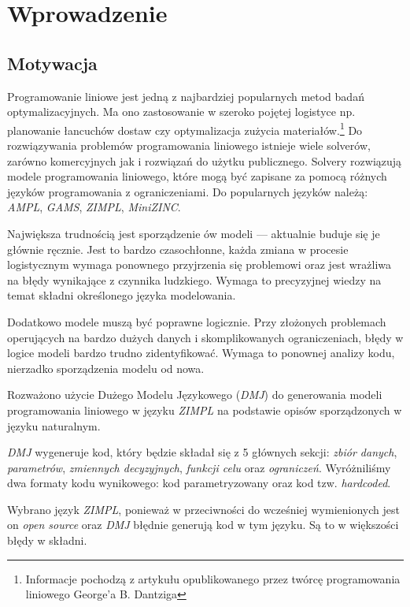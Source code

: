 
\chapter{Wprowadzenie}

\section{Motywacja}

Programowanie liniowe jest jedną z najbardziej popularnych metod badań optymalizacyjnych. Ma ono zastosowanie w szeroko pojętej logistyce np. planowanie łancuchów dostaw czy optymalizacja zużycia materiałów.\footnote{Informacje pochodzą z artykułu opublikowanego przez twórcę programowania liniowego George'a B. Dantziga\cite{dantzig2002linear}} Do rozwiązywania problemów programowania liniowego istnieje wiele solverów, zarówno komercyjnych jak i rozwiązań do użytku publicznego. Solvery rozwiązują modele programowania liniowego, które mogą być zapisane za pomocą różnych języków programowania z ograniczeniami. Do popularnych języków należą: \textit{AMPL}, \textit{GAMS}, \textit{ZIMPL}, \textit{MiniZINC}.

Największa trudnością jest sporządzenie ów modeli --- aktualnie buduje się je głównie ręcznie. Jest to bardzo czasochłonne, każda zmiana w procesie logistycznym wymaga ponownego przyjrzenia się problemowi oraz jest wrażliwa na błędy wynikające z czynnika ludzkiego. Wymaga to precyzyjnej wiedzy na temat składni określonego języka modelowania.

Dodatkowo modele muszą być poprawne logicznie. Przy złożonych problemach operujących na bardzo dużych danych i skomplikowanych ograniczeniach, błędy w logice modeli bardzo trudno zidentyfikować. Wymaga to ponownej analizy kodu, nierzadko sporządzenia modelu od nowa.

Rozważono użycie Dużego Modelu Językowego (\textit{DMJ}) do generowania modeli programowania liniowego w języku \textit{ZIMPL} na podstawie opisów sporządzonych w języku naturalnym.

\textit{DMJ} wygeneruje kod, który będzie składał się z 5 głównych sekcji: \textit{zbiór danych}, \textit{parametrów}, \textit{zmiennych decyzyjnych}, \textit{funkcji celu} oraz \textit{ograniczeń}. Wyróżniliśmy dwa formaty kodu wynikowego: kod parametryzowany oraz kod tzw. \textit{hardcoded}. 

Wybrano język \textit{ZIMPL}, ponieważ w przeciwności do wcześniej wymienionych jest on \textit{open source} oraz \textit{DMJ} błędnie generują kod w tym języku. Są to w większości błędy w składni.

